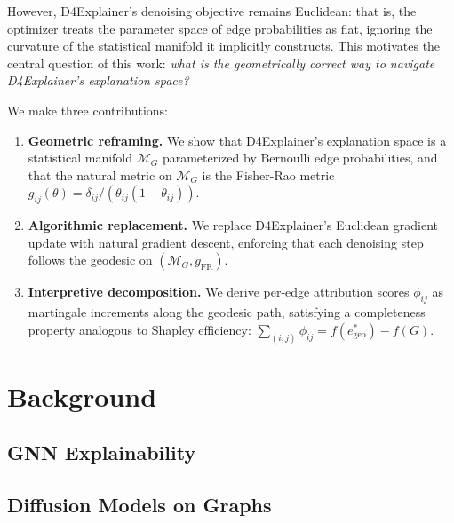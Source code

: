 \documentclass[11pt]{article}
\newcommand{\MG}{\mathcal{M}_G}
\newcommand{\phil}{\phi_{ij}}
\newcommand{\thetaij}{\theta_{ij}}
\begin{document}
However, D4Explainer's denoising objective remains Euclidean: that is, the
optimizer treats the parameter space of edge probabilities as flat,
ignoring the curvature of the statistical manifold it implicitly
constructs. This motivates the central question of this work:
\emph{what is the geometrically correct way to navigate D4Explainer's
explanation space?}

We make three contributions:
\begin{enumerate}
  \item \textbf{Geometric reframing.} We show that D4Explainer's
    explanation space is a statistical manifold $\MG$ parameterized by
    Bernoulli edge probabilities, and that the natural metric on $\MG$
    is the Fisher-Rao metric $g_{ij}(\theta) =
    \delta_{ij}/(\thetaij(1-\thetaij))$.

  \item \textbf{Algorithmic replacement.} We replace D4Explainer's
    Euclidean gradient update with natural gradient descent, enforcing
    that each denoising step follows the geodesic on $(\MG,
    g_{\text{FR}})$.

  \item \textbf{Interpretive decomposition.} We derive per-edge
    attribution scores $\phil$ as martingale increments along the
    geodesic path, satisfying a completeness property analogous to
    Shapley efficiency: $\sum_{(i,j)} \phil =
    f(e^*_{\text{geo}}) - f(G)$.
\end{enumerate}

\section{Background}

\subsection{GNN Explainability}


\subsection{Diffusion Models on Graphs}
\end{document}
